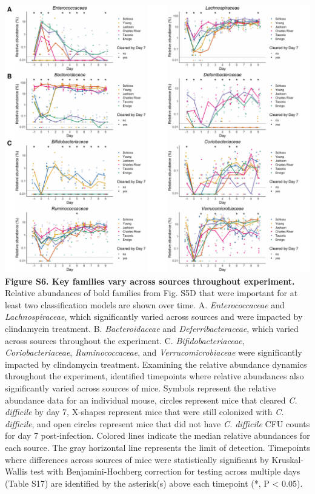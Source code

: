 \documentclass[11pt,]{article}
\begin{document}
\newpage

\includegraphics{figure_S6.pdf} \textbf{Figure S6. Key families vary
across sources throughout experiment.} Relative abundances of bold
families from Fig. S5D that were important for at least two
classification models are shown over time. A. \emph{Enterococcaceae} and
\emph{Lachnospiraceae}, which significantly varied across sources and
were impacted by clindamycin treatment. B. \emph{Bacteroidaceae} and
\emph{Deferribacteraceae}, which varied across sources throughout the
experiment. C. \emph{Bifidobacteriaceae}, \emph{Coriobacteriaceae},
\emph{Ruminococcaceae}, and \emph{Verrucomicrobiaceae} were
significantly impacted by clindamycin treatment. Examining the relative
abundance dynamics throughout the experiment, identified timepoints
where relative abundances also significantly varied across sources of
mice. Symbols represent the relative abundance data for an individual
mouse, circles represent mice that cleared \emph{C. difficile} by day 7,
X-shapes represent mice that were still colonized with \emph{C.
difficile}, and open circles represent mice that did not have \emph{C.
difficile} CFU counts for day 7 post-infection. Colored lines indicate
the median relative abundances for each source. The gray horizontal line
represents the limit of detection. Timepoints where differences across
sources of mice were statistically significant by Kruskal-Wallis test
with Benjamini-Hochberg correction for testing across multiple days
(Table S17) are identified by the asterisk(s) above each timepoint (*, P
\textless{} 0.05).
\end{document}
